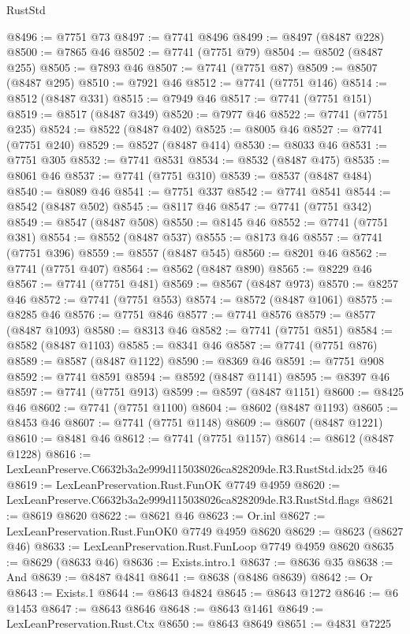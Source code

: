 \begin{lexlean}{RustStd}
\begin{coremodule}
@8496 := @7751 @73
@8497 := @7741 @8496
@8499 := @8497 (@8487 @228)
@8500 := @7865 @46
@8502 := @7741 (@7751 @79)
@8504 := @8502 (@8487 @255)
@8505 := @7893 @46
@8507 := @7741 (@7751 @87)
@8509 := @8507 (@8487 @295)
@8510 := @7921 @46
@8512 := @7741 (@7751 @146)
@8514 := @8512 (@8487 @331)
@8515 := @7949 @46
@8517 := @7741 (@7751 @151)
@8519 := @8517 (@8487 @349)
@8520 := @7977 @46
@8522 := @7741 (@7751 @235)
@8524 := @8522 (@8487 @402)
@8525 := @8005 @46
@8527 := @7741 (@7751 @240)
@8529 := @8527 (@8487 @414)
@8530 := @8033 @46
@8531 := @7751 @305
@8532 := @7741 @8531
@8534 := @8532 (@8487 @475)
@8535 := @8061 @46
@8537 := @7741 (@7751 @310)
@8539 := @8537 (@8487 @484)
@8540 := @8089 @46
@8541 := @7751 @337
@8542 := @7741 @8541
@8544 := @8542 (@8487 @502)
@8545 := @8117 @46
@8547 := @7741 (@7751 @342)
@8549 := @8547 (@8487 @508)
@8550 := @8145 @46
@8552 := @7741 (@7751 @381)
@8554 := @8552 (@8487 @537)
@8555 := @8173 @46
@8557 := @7741 (@7751 @396)
@8559 := @8557 (@8487 @545)
@8560 := @8201 @46
@8562 := @7741 (@7751 @407)
@8564 := @8562 (@8487 @890)
@8565 := @8229 @46
@8567 := @7741 (@7751 @481)
@8569 := @8567 (@8487 @973)
@8570 := @8257 @46
@8572 := @7741 (@7751 @553)
@8574 := @8572 (@8487 @1061)
@8575 := @8285 @46
@8576 := @7751 @846
@8577 := @7741 @8576
@8579 := @8577 (@8487 @1093)
@8580 := @8313 @46
@8582 := @7741 (@7751 @851)
@8584 := @8582 (@8487 @1103)
@8585 := @8341 @46
@8587 := @7741 (@7751 @876)
@8589 := @8587 (@8487 @1122)
@8590 := @8369 @46
@8591 := @7751 @908
@8592 := @7741 @8591
@8594 := @8592 (@8487 @1141)
@8595 := @8397 @46
@8597 := @7741 (@7751 @913)
@8599 := @8597 (@8487 @1151)
@8600 := @8425 @46
@8602 := @7741 (@7751 @1100)
@8604 := @8602 (@8487 @1193)
@8605 := @8453 @46
@8607 := @7741 (@7751 @1148)
@8609 := @8607 (@8487 @1221)
@8610 := @8481 @46
@8612 := @7741 (@7751 @1157)
@8614 := @8612 (@8487 @1228)
@8616 := LexLeanPreserve.C6632b3a2e999d115038026ca828209de.R3.RustStd.idx25 @46
@8619 := LexLeanPreservation.Rust.FunOK @7749 @4959
@8620 := LexLeanPreserve.C6632b3a2e999d115038026ca828209de.R3.RustStd.flags
@8621 := @8619 @8620
@8622 := @8621 @46
@8623 := Or.inl
@8627 := LexLeanPreservation.Rust.FunOK0 @7749 @4959 @8620
@8629 := @8623 (@8627 @46)
@8633 := LexLeanPreservation.Rust.FunLoop @7749 @4959 @8620
@8635 := @8629 (@8633 @46)
@8636 := Exists.intro.{1}
@8637 := @8636 @35
@8638 := And
@8639 := @8487 @4841
@8641 := @8638 (@8486 @8639)
@8642 := Or
@8643 := Exists.{1}
@8644 := @8643 @4824
@8645 := @8643 @1272
@8646 := @6 @1453
@8647 := @8643 @8646
@8648 := @8643 @1461
@8649 := LexLeanPreservation.Rust.Ctx
@8650 := @8643 @8649
@8651 := @4831 @7225

\end{coremodule}
\end{lexlean}
